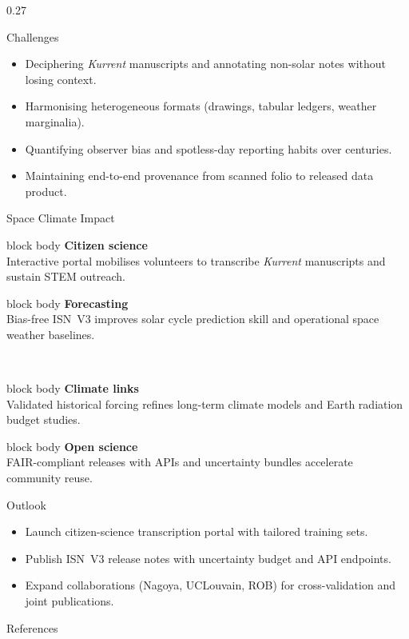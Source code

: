 \documentclass[final]{beamer}
\newcommand{\callout}[2]{%
  \begin{beamercolorbox}[wd=\linewidth,sep=0.6em,rounded=true,shadow=false]{block body}%
    {\bfseries\color{royal}#1}\\[-0.3em]
    {\footnotesize #2}%
  \end{beamercolorbox}%
}
\newenvironment{tightblock}[1]{%
  \begin{block}{#1}\vspace{0.35em}
}{\end{block}}
\begin{document}
\begin{frame}[t]
\begin{columns}[t,totalwidth=0.98\paperwidth]
\begin{column}{0.27\paperwidth}
\begin{tightblock}{Challenges}
\begin{itemize}
  \item Deciphering \emph{Kurrent} manuscripts and annotating non-solar notes without losing context.
  \item Harmonising heterogeneous formats (drawings, tabular ledgers, weather marginalia).
  \item Quantifying observer bias and spotless-day reporting habits over centuries.
  \item Maintaining end-to-end provenance from scanned folio to released data product.
\end{itemize}
\end{tightblock}

\begin{tightblock}{Space Climate Impact}
\begin{minipage}[t]{0.48\linewidth}
  \callout{Citizen science}{Interactive portal mobilises volunteers to transcribe \emph{Kurrent} manuscripts and sustain STEM outreach.}
\end{minipage}\hfill
\begin{minipage}[t]{0.48\linewidth}
  \callout{Forecasting}{Bias-free ISN~V3 improves solar cycle prediction skill and operational space weather baselines.}
\end{minipage}\\[0.6em]
\begin{minipage}[t]{0.48\linewidth}
  \callout{Climate links}{Validated historical forcing refines long-term climate models and Earth radiation budget studies.}
\end{minipage}\hfill
\begin{minipage}[t]{0.48\linewidth}
  \callout{Open science}{FAIR-compliant releases with APIs and uncertainty bundles accelerate community reuse.}
\end{minipage}
\end{tightblock}

\begin{tightblock}{Outlook}
\begin{itemize}
  \item Launch citizen-science transcription portal with tailored training sets.
  \item Publish ISN~V3 release notes with uncertainty budget and API endpoints.
  \item Expand collaborations (Nagoya, UCLouvain, ROB) for cross-validation and joint publications.
\end{itemize}
\end{tightblock}

\begin{tightblock}{References}
{\footnotesize }
\end{tightblock}
\end{column}

\end{columns}
\end{frame}
\end{document}
